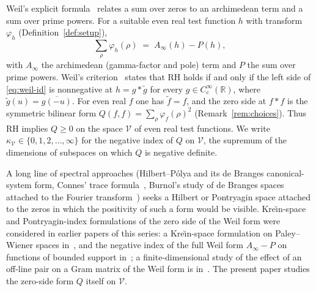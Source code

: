 \documentclass[11pt]{amsart}
\theoremstyle{definition}
\theoremstyle{remark}
\newcommand{\RH}{\mathrm{RH}}
\newcommand{\kV}{\kappa_{\mathcal V}}
\begin{document}
Weil's explicit formula~\cite{Weil} relates a sum over zeros to an archimedean term and a sum
over prime powers. For a suitable even real test function $h$ with transform $\varphi_h$
(Definition~\ref{def:setup}),
\begin{equation}\label{eq:weil-id}
\sum_\rho\varphi_h(\rho)\;=\;A_\infty(h)-P(h),
\end{equation}
with $A_\infty$ the archimedean (gamma-factor and pole) term and $P$ the sum over prime powers.
Weil's criterion~\cite{Weil,Bombieri} states that $\RH$ holds if and only if the left side of
\eqref{eq:weil-id} is nonnegative at $h=g*\tilde g$ for every $g\in C_c^\infty(\mathbb R)$, where
$\tilde g(u)=\overline{g(-u)}$. For even real $f$ one has $\tilde f=f$, and the zero side at $f*f$
is the symmetric bilinear form $Q(f,f)=\sum_\rho\varphi_f(\rho)^2$ (Remark~\ref{rem:choices}).
Thus $\RH$ implies $Q\ge0$ on the space $\mathcal V$ of even real test functions. We write
$\kV\in\{0,1,2,\dots,\infty\}$ for the negative index of $Q$ on $\mathcal V$, the supremum of the
dimensions of subspaces on which $Q$ is negative definite.

A long line of spectral approaches (Hilbert--P\'olya and its de Branges canonical-system form,
Connes' trace formula~\cite{Connes99}, Burnol's study of de Branges spaces attached to the
Fourier transform~\cite{Burnol}) seeks a Hilbert or Pontryagin space attached to the zeros in
which the positivity of such a form would be visible. Kre\u\i n-space and Pontryagin-index
formulations of the zero side of the Weil form were considered in earlier papers of this
series: a Kre\u\i n-space formulation on Paley--Wiener spaces in~\cite{P8}, and the negative
index of the full Weil form $A_\infty-P$ on functions of bounded support in~\cite{P11}; a
finite-dimensional study of the effect of an off-line pair on a Gram matrix of the Weil form is
in~\cite{P7}. The present paper studies the zero-side form $Q$ itself on $\mathcal V$.
\end{document}
